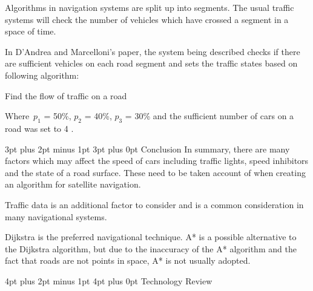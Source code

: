 \documentclass[12pt,a4paper]{article}
\makeatletter
\renewcommand\subsection{\@startsection {subsection}{1}{0mm} %
                               {3pt plus 2pt minus 1pt} %
                               {3pt plus 0pt} %
                               {\normalfont\bfseries}}
\renewcommand\section{\@startsection {section}{1}{0mm} %
                               {4pt plus 2pt minus 1pt} %
                               {4pt plus 0pt} %
                               {\Large\bfseries}}
\makeatother
\begin{document}
Algorithms in navigation systems are split up into segments. The usual traffic systems will check the number of vehicles which have crossed a segment in a space of time.

In D'Andrea and Marcelloni’s paper, the system being described checks if there are sufficient vehicles on each road segment and sets the traffic states based on following algorithm:

\begin{algorithm}[H]
  \SetAlgoLined
   \caption{Find the flow of traffic on a road}
  \end{algorithm}

  Where~$p_1$ = 50\%, $p_2$ = 40\%, $p_3$ = 30\% and the sufficient number of cars on a road was set to 4 \cite{DAndrea2017}.
  
  \subsection{Conclusion}
 In summary, there are many factors which may affect the speed of cars including traffic lights, speed inhibitors and the state of a road surface. These need to be taken account of when creating an algorithm for satellite navigation.
 
  Traffic data is an additional factor to consider and is a common consideration in many navigational systems.
 
 Dijkstra is the preferred navigational technique. A* is a possible alternative to the Dijkstra algorithm, but due to the inaccuracy of the A* algorithm and the fact that roads are not points in space, A* is not usually adopted.
 
\section{Technology Review}
\end{document}
